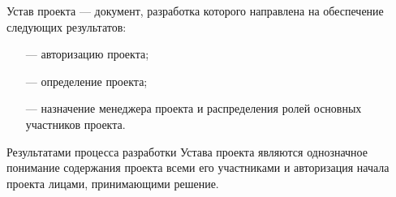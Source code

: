Устав проекта --- документ, разработка которого направлена на обеспечение следующих результатов:
\begin{itemize}
	\item [---]авторизацию проекта;
\item [---]определение проекта;
\item [---]назначение менеджера проекта и распределения ролей основных участников проекта.
\end{itemize}

Результатами процесса разработки Устава проекта являются однознач­ное понимание содержания проекта всеми его участниками и автори­зация начала проекта лицами, принимающими решение.






